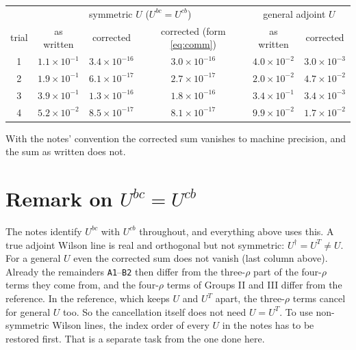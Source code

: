 \documentclass[10pt]{article}
\numberwithin{equation}{section}
\newcommand{\lab}[1]{\texttt{#1}}
\begin{document}
\begin{center}\small
\begin{tabular}{@{}c c c c c c@{}}
& \multicolumn{3}{c}{symmetric $U$ ($U^{bc}=U^{cb}$)} & \multicolumn{2}{c}{general adjoint $U$}\\
trial & as written & corrected & corrected (form \eqref{eq:comm}) & as written & corrected\\ \hline
1 & $1.1\times10^{-1}$ & $3.4\times10^{-16}$ & $3.0\times10^{-16}$ & $4.0\times10^{-2}$ & $3.0\times10^{-3}$\\
2 & $1.9\times10^{-1}$ & $6.1\times10^{-17}$ & $2.7\times10^{-17}$ & $2.0\times10^{-2}$ & $4.7\times10^{-2}$\\
3 & $3.9\times10^{-1}$ & $1.3\times10^{-16}$ & $1.8\times10^{-16}$ & $3.4\times10^{-1}$ & $3.4\times10^{-3}$\\
4 & $5.2\times10^{-2}$ & $8.5\times10^{-17}$ & $8.1\times10^{-17}$ & $9.9\times10^{-2}$ & $1.7\times10^{-2}$\\
\end{tabular}
\end{center}
With the notes' convention the corrected sum vanishes to machine precision, and the sum as written does not.

\section{Remark on \texorpdfstring{$U^{bc}=U^{cb}$}{U symmetric}}\label{sec:Usym}

The notes identify $U^{bc}$ with $U^{cb}$ throughout, and everything above uses this. A true adjoint Wilson line is real and orthogonal but not symmetric: $U^{\dagger}=U^T\neq U$. For a general $U$ even the corrected sum does not vanish (last column above). Already the remainders \lab{A1}--\lab{B2} then differ from the three-$\rho$ part of the four-$\rho$ terms they come from, and the four-$\rho$ terms of Groups II and III differ from the reference. In the reference, which keeps $U$ and $U^T$ apart, the three-$\rho$ terms cancel for general $U$ too. So the cancellation itself does not need $U=U^T$. To use non-symmetric Wilson lines, the index order of every $U$ in the notes has to be restored first. That is a separate task from the one done here.

\appendix
\end{document}
